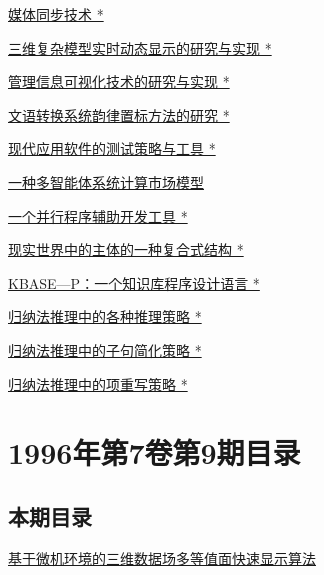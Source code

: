 \documentclass[a4paper]{article}
\begin{document}
\href{http://www.jos.org.cn/ch/reader/download_pdf.aspx?file_no=1996s173&year_id=1996&quarter_id=zk&falg=1}{媒体同步技术 *}

\href{http://www.jos.org.cn/ch/reader/download_pdf.aspx?file_no=1996s174&year_id=1996&quarter_id=zk&falg=1}{三维复杂模型实时动态显示的研究与实现 *}

\href{http://www.jos.org.cn/ch/reader/download_pdf.aspx?file_no=1996s175&year_id=1996&quarter_id=zk&falg=1}{管理信息可视化技术的研究与实现 *}

\href{http://www.jos.org.cn/ch/reader/download_pdf.aspx?file_no=1996s176&year_id=1996&quarter_id=zk&falg=1}{文语转换系统韵律置标方法的研究 *}

\href{http://www.jos.org.cn/ch/reader/download_pdf.aspx?file_no=1996s177&year_id=1996&quarter_id=zk&falg=1}{现代应用软件的测试策略与工具 *}

\href{http://www.jos.org.cn/ch/reader/download_pdf.aspx?file_no=1996s178&year_id=1996&quarter_id=zk&falg=1}{一种多智能体系统计算市场模型}

\href{http://www.jos.org.cn/ch/reader/download_pdf.aspx?file_no=1996s179&year_id=1996&quarter_id=zk&falg=1}{一个并行程序辅助开发工具 *}

\href{http://www.jos.org.cn/ch/reader/download_pdf.aspx?file_no=1996s180&year_id=1996&quarter_id=zk&falg=1}{现实世界中的主体的一种复合式结构 *}

\href{http://www.jos.org.cn/ch/reader/download_pdf.aspx?file_no=1996s181&year_id=1996&quarter_id=zk&falg=1}{KBASE—P：一个知识库程序设计语言 *}

\href{http://www.jos.org.cn/ch/reader/download_pdf.aspx?file_no=1996s182&year_id=1996&quarter_id=zk&falg=1}{归纳法推理中的各种推理策略 *}

\href{http://www.jos.org.cn/ch/reader/download_pdf.aspx?file_no=1996s183&year_id=1996&quarter_id=zk&falg=1}{归纳法推理中的子句简化策略 *}

\href{http://www.jos.org.cn/ch/reader/download_pdf.aspx?file_no=1996s184&year_id=1996&quarter_id=zk&falg=1}{归纳法推理中的项重写策略 *}


\section{\textbf{1996年第7卷第9期目录}}
\subsection{本期目录}
\href{http://www.jos.org.cn/ch/reader/download_pdf.aspx?file_no=19960901&year_id=1996&quarter_id=9&falg=1}{基于微机环境的三维数据场多等值面快速显示算法}
\end{document}
